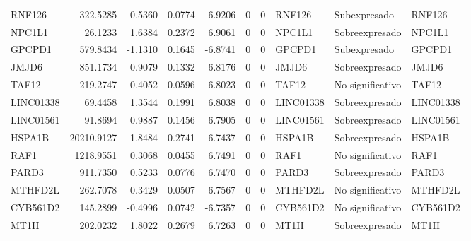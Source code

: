 \begin{table}
{\begin{tabular}[t]{lrrrrrrlll}
RNF126 & 322.5285 & -0.5360 & 0.0774 & -6.9206 & 0 & 0 & RNF126 & Subexpresado & RNF126\\
NPC1L1 & 26.1233 & 1.6384 & 0.2372 & 6.9061 & 0 & 0 & NPC1L1 & Sobreexpresado & NPC1L1\\
GPCPD1 & 579.8434 & -1.1310 & 0.1645 & -6.8741 & 0 & 0 & GPCPD1 & Subexpresado & GPCPD1\\
\addlinespace
JMJD6 & 851.1734 & 0.9079 & 0.1332 & 6.8176 & 0 & 0 & JMJD6 & Sobreexpresado & JMJD6\\
TAF12 & 219.2747 & 0.4052 & 0.0596 & 6.8023 & 0 & 0 & TAF12 & No significativo & TAF12\\
LINC01338 & 69.4458 & 1.3544 & 0.1991 & 6.8038 & 0 & 0 & LINC01338 & Sobreexpresado & LINC01338\\
LINC01561 & 91.8694 & 0.9887 & 0.1456 & 6.7905 & 0 & 0 & LINC01561 & Sobreexpresado & LINC01561\\
HSPA1B & 20210.9127 & 1.8484 & 0.2741 & 6.7437 & 0 & 0 & HSPA1B & Sobreexpresado & HSPA1B\\
\addlinespace
RAF1 & 1218.9551 & 0.3068 & 0.0455 & 6.7491 & 0 & 0 & RAF1 & No significativo & RAF1\\
PARD3 & 911.7350 & 0.5233 & 0.0776 & 6.7470 & 0 & 0 & PARD3 & Sobreexpresado & PARD3\\
MTHFD2L & 262.7078 & 0.3429 & 0.0507 & 6.7567 & 0 & 0 & MTHFD2L & No significativo & MTHFD2L\\
CYB561D2 & 145.2899 & -0.4996 & 0.0742 & -6.7357 & 0 & 0 & CYB561D2 & No significativo & CYB561D2\\
MT1H & 202.0232 & 1.8022 & 0.2679 & 6.7263 & 0 & 0 & MT1H & Sobreexpresado & MT1H\\
\bottomrule
\end{tabular}}
\end{table}
